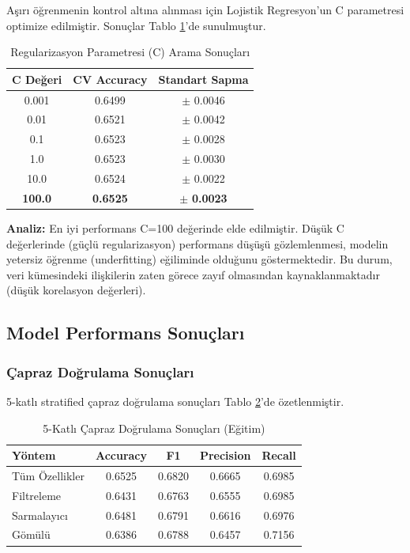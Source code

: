 \documentclass[conference]{IEEEtran}
\begin{document}
Aşırı öğrenmenin kontrol altına alınması için Lojistik Regresyon'un C parametresi optimize edilmiştir. Sonuçlar Tablo \ref{tab:regularization}'de sunulmuştur.

\begin{table}[H]
\centering
\caption{Regularizasyon Parametresi (C) Arama Sonuçları}
\label{tab:regularization}
\begin{tabular}{ccc}
\toprule
\textbf{C Değeri} & \textbf{CV Accuracy} & \textbf{Standart Sapma} \\
\midrule
0.001 & 0.6499 & $\pm$ 0.0046 \\
0.01 & 0.6521 & $\pm$ 0.0042 \\
0.1 & 0.6523 & $\pm$ 0.0028 \\
1.0 & 0.6523 & $\pm$ 0.0030 \\
10.0 & 0.6524 & $\pm$ 0.0022 \\
\textbf{100.0} & \textbf{0.6525} & $\pm$ \textbf{0.0023} \\
\bottomrule
\end{tabular}
\end{table}

\textbf{Analiz:} En iyi performans C=100 değerinde elde edilmiştir. Düşük C değerlerinde (güçlü regularizasyon) performans düşüşü gözlemlenmesi, modelin yetersiz öğrenme (underfitting) eğiliminde olduğunu göstermektedir. Bu durum, veri kümesindeki ilişkilerin zaten görece zayıf olmasından kaynaklanmaktadır (düşük korelasyon değerleri).

\subsection{Model Performans Sonuçları}

\subsubsection{Çapraz Doğrulama Sonuçları}

5-katlı stratified çapraz doğrulama sonuçları Tablo \ref{tab:cv_results}'de özetlenmiştir.

\begin{table}[H]
\centering
\caption{5-Katlı Çapraz Doğrulama Sonuçları (Eğitim)}
\label{tab:cv_results}
\begin{tabular}{lcccc}
\toprule
\textbf{Yöntem} & \textbf{Accuracy} & \textbf{F1} & \textbf{Precision} & \textbf{Recall} \\
\midrule
Tüm Özellikler & 0.6525 & 0.6820 & 0.6665 & 0.6985 \\
Filtreleme & 0.6431 & 0.6763 & 0.6555 & 0.6985 \\
Sarmalayıcı & 0.6481 & 0.6791 & 0.6616 & 0.6976 \\
Gömülü & 0.6386 & 0.6788 & 0.6457 & 0.7156 \\
\bottomrule
\end{tabular}
\end{table}
\end{document}
